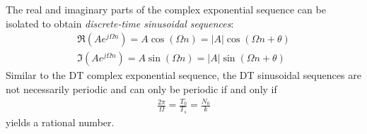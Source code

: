 \documentclass{report}
\begin{document}
\\ \\
The real and imaginary parts of the complex exponential sequence can be isolated to obtain \emph{discrete-time sinusoidal sequences}:
\begin{align}
    \Re(Ae^{j\Omega n}) = A \cos(\Omega n) = |A| \cos(\Omega n + \theta) \\
    \Im(Ae^{j\Omega n}) = A \sin(\Omega n) = |A| \sin(\Omega n + \theta)
\end{align}
Similar to the DT complex exponential sequence, the DT sinusoidal sequences are not necessarily periodic and can only be periodic if and only if
\begin{align}
    \frac{2\pi}{\Omega} = \frac{T_0}{T_s} = \frac{N_0}{k}
\end{align}
yields a rational number.
\end{document}
